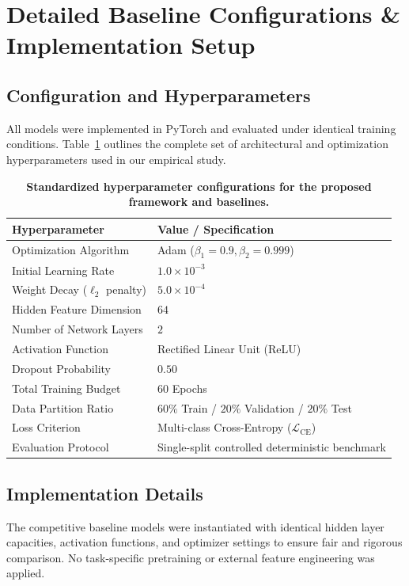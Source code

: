 \documentclass[10pt,twocolumn]{article}
\begin{document}
\section{Detailed Baseline Configurations \& Implementation Setup}
\subsection{Configuration and Hyperparameters}
All models were implemented in PyTorch and evaluated under identical training conditions. Table~\ref{tab:hyperparameters} outlines the complete set of architectural and optimization hyperparameters used in our empirical study.

\begin{table}[t]
\centering
\caption{\textbf{Standardized hyperparameter configurations for the proposed framework and baselines.}}
\begin{tabular}{ll}
\toprule
\textbf{Hyperparameter} & \textbf{Value / Specification} \\
\midrule
Optimization Algorithm & Adam ($\beta_1 = 0.9, \beta_2 = 0.999$) \\
Initial Learning Rate & $1.0 \times 10^{-3}$ \\
Weight Decay ($\ell_2$ penalty) & $5.0 \times 10^{-4}$ \\
Hidden Feature Dimension & $64$ \\
Number of Network Layers & $2$ \\
Activation Function & Rectified Linear Unit (ReLU) \\
Dropout Probability & $0.50$ \\
Total Training Budget & $60$ Epochs \\
Data Partition Ratio & $60\%$ Train / $20\%$ Validation / $20\%$ Test \\
Loss Criterion & Multi-class Cross-Entropy ($\mathcal{L}_{\mathrm{CE}}$) \\
Evaluation Protocol & Single-split controlled deterministic benchmark \\
\bottomrule
\end{tabular}
\label{tab:hyperparameters}
\end{table}

\subsection{Implementation Details}
The competitive baseline models were instantiated with identical hidden layer capacities, activation functions, and optimizer settings to ensure fair and rigorous comparison. No task-specific pretraining or external feature engineering was applied.
\end{document}
